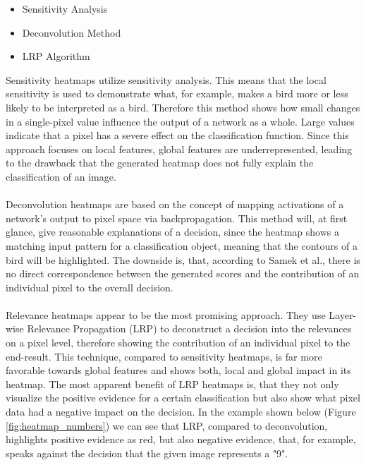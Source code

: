\documentclass{acmsiggraph}               %
\begin{document}
\begin{itemize}
  \setlength\itemsep{0em}
  \item Sensitivity Analysis
  \item Deconvolution Method
  \item LRP Algorithm
\end{itemize}

Sensitivity heatmaps utilize sensitivity analysis. This means that the local sensitivity is used to demonstrate what, for example, makes a bird more or less likely to be interpreted as a bird. Therefore this method shows how small changes in a single-pixel value influence the output of a network as a whole. Large values indicate that a pixel has a severe effect on the classification function. Since this approach focuses on local features, global features are underrepresented, leading to the drawback that the generated heatmap does not fully explain the classification of an image.\\\\
Deconvolution heatmaps are based on the concept of mapping activations of a network's output to pixel space via backpropagation. This method will, at first glance, give reasonable explanations of a decision, since the heatmap shows a matching input pattern for a classification object, meaning that the contours of a bird will be highlighted. The downside is, that, according to Samek et al., there is no direct correspondence between the generated scores and the contribution of an individual pixel to the overall decision.\\\\
Relevance heatmaps appear to be the most promising approach. They use Layer-wise Relevance Propagation (LRP) to deconstruct a decision into the relevances on a pixel level, therefore showing the contribution of an individual pixel to the end-result. This technique, compared to sensitivity heatmaps, is far more favorable towards global features and shows both, local and global impact in its heatmap. The most apparent benefit of LRP heatmaps is, that they not only visualize the positive evidence for a certain classification but also show what pixel data had a negative impact on the decision. In the example shown below (Figure \ref{fig:heatmap_numbers}) we can see that LRP, compared to deconvolution, highlights positive evidence as red, but also negative evidence, that, for example, speaks against the decision that the given image represents a "9".
\end{document}
